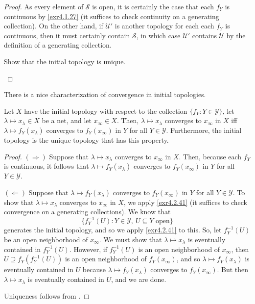 \begin{prp}
\begin{savenotes}
\begin{proof}
As every element of $\mathcal{S}$ is open, it is certainly the case that each $f_Y$ is continuous by \cref{exr4.1.27} (it suffices to check continuity on a generating collection).  On the other hand, if $\mathcal{U}'$ is another topology for each each $f_Y$ is continuous, then it must certainly contain $\mathcal{S}$, in which case $\mathcal{U}'$ contains $\mathcal{U}$ by the definition of a generating collection.

\begin{exr}
Show that the initial topology is unique.
\end{exr}
\end{proof}
\end{savenotes}
\end{prp}
There is a nice characterization of convergence in initial topologies.
\begin{prp}\label{prp4.4.5}
Let $X$ have the initial topology with respect to the collection $\{ f_Y:Y\in \mathcal{Y}\}$, let $\lambda \mapsto x_\lambda \in X$ be a net, and let $x_\infty \in X$.  Then, $\lambda \mapsto x_\lambda$ converges to $x_\infty$ in $X$ iff $\lambda \mapsto f_Y(x_\lambda )$ converges to $f_Y(x_\infty )$ in $Y$ for all $Y\in \mathcal{Y}$.  Furthermore, the initial topology is the unique topology that has this property.
\begin{proof}
$(\Rightarrow )$ Suppose that $\lambda \mapsto x_\lambda$ converges to $x_\infty$ in $X$.  Then, because each $f_Y$ is continuous, it follows that $\lambda \mapsto f_Y(x_\lambda )$ converges to $f_Y(x_\infty )$ in $Y$ for all $Y\in \mathcal{Y}$.

\blankline
\noindent
$(\Leftarrow )$ Suppose that $\lambda \mapsto f_Y(x_\lambda )$ converges to $f_Y(x_\infty )$ in $Y$ for all $Y\in \mathcal{Y}$.  To show that $\lambda \mapsto x_\lambda$ converges to $x_\infty$ in $X$, we apply \cref{exr4.2.41} (it suffices to check convergence on a generating collections).  We know that
\begin{equation}
\{ f_Y^{-1}(U):Y\in \mathcal{Y},\ U\subseteq Y\text{ open}\}
\end{equation}
generates the initial topology, and so we apply \cref{exr4.2.41} to this.  So, let $f_Y^{-1}(U)$ be an open neighborhood of $x_\infty$.  We must show that $\lambda \mapsto x_\lambda$ is eventually contained in $f_Y^{-1}(U)$.  However, if $f_Y^{-1}(U)$ is an open neighborhood of $x_\infty$, then $U\supseteq f_Y(f_Y^{-1}(U))$ is an open neighborhood of $f_Y(x_\infty )$, and so $\lambda \mapsto f_Y(x_\lambda )$ is eventually contained in $U$ because $\lambda \mapsto f_Y(x_\lambda )$ converges to $f_Y(x_\infty )$.  But then $\lambda \mapsto x_\lambda$ is eventually contained in $U$, and we are done.

\blankline
\noindent
Uniqueness follows from .
\end{proof}
\end{prp}
